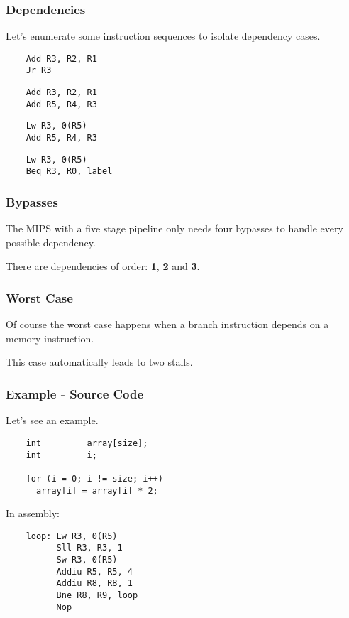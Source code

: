 
\begin{frame}[containsverbatim]
  \frametitle{Dependencies}

  Let's enumerate some instruction sequences to isolate dependency
  cases.

  \begin{verbatim}
    Add R3, R2, R1
    Jr R3
  \end{verbatim}

  \begin{verbatim}
    Add R3, R2, R1
    Add R5, R4, R3
  \end{verbatim}

  \begin{verbatim}
    Lw R3, 0(R5)
    Add R5, R4, R3
  \end{verbatim}

  \begin{verbatim}
    Lw R3, 0(R5)
    Beq R3, R0, label
  \end{verbatim}
\end{frame}


\begin{frame}
  \frametitle{Bypasses}

  The MIPS with a five stage pipeline only needs four bypasses to
  handle every possible dependency.

  \-

  There are dependencies of order: \textbf{1}, \textbf{2} and \textbf{3}.

  \begin{center}
  \end{center}
\end{frame}


\begin{frame}
  \frametitle{Worst Case}

  Of course the worst case happens when a branch instruction depends on
  a memory instruction.

  \-

  This case automatically leads to two stalls.
\end{frame}


\begin{frame}[containsverbatim]
  \frametitle{Example - Source Code}

  Let's see an example.

  \begin{verbatim}
    int         array[size];
    int         i;

    for (i = 0; i != size; i++)
      array[i] = array[i] * 2;
  \end{verbatim}

  In assembly:

  \begin{verbatim}
    loop: Lw R3, 0(R5)
          Sll R3, R3, 1
          Sw R3, 0(R5)
          Addiu R5, R5, 4
          Addiu R8, R8, 1
          Bne R8, R9, loop
          Nop
  \end{verbatim}
\end{frame}


